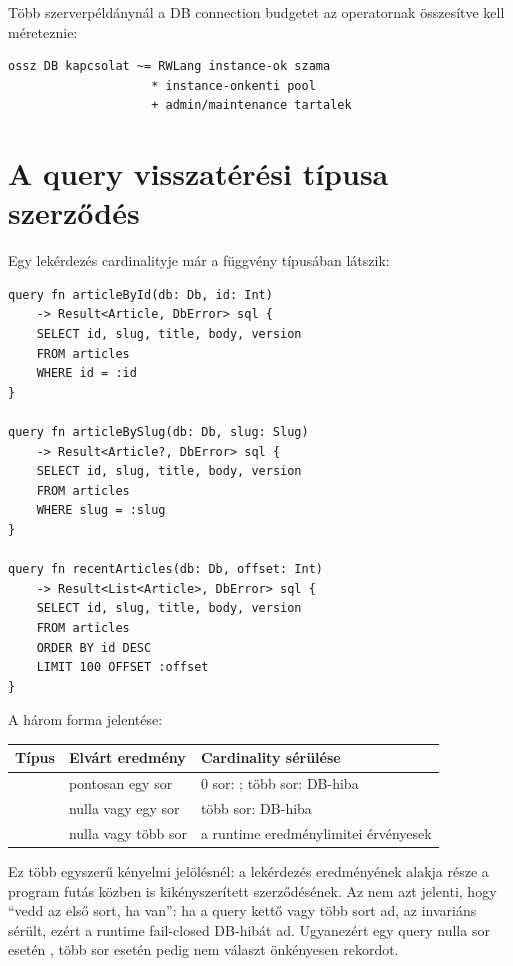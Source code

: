 Több szerverpéldánynál a DB connection budgetet az operatornak összesítve kell méreteznie:

\begin{lstlisting}
ossz DB kapcsolat ~= RWLang instance-ok szama
                    * instance-onkenti pool
                    + admin/maintenance tartalek
\end{lstlisting}

\section{A query visszatérési típusa szerződés}

Egy lekérdezés cardinalityje már a függvény típusában látszik:

\begin{lstlisting}[language=RWLang]
query fn articleById(db: Db, id: Int)
    -> Result<Article, DbError> sql {
    SELECT id, slug, title, body, version
    FROM articles
    WHERE id = :id
}

query fn articleBySlug(db: Db, slug: Slug)
    -> Result<Article?, DbError> sql {
    SELECT id, slug, title, body, version
    FROM articles
    WHERE slug = :slug
}

query fn recentArticles(db: Db, offset: Int)
    -> Result<List<Article>, DbError> sql {
    SELECT id, slug, title, body, version
    FROM articles
    ORDER BY id DESC
    LIMIT 100 OFFSET :offset
}
\end{lstlisting}

A három forma jelentése:

\begin{center}
\begin{tabularx}{\textwidth}{@{}L{0.23\textwidth}YY@{}}
\toprule
Típus & Elvárt eredmény & Cardinality sérülése \\
\midrule
{} & pontosan egy sor & 0 sor: ; több sor: DB-hiba \\
 & nulla vagy egy sor & több sor: DB-hiba \\
 & nulla vagy több sor & a runtime eredménylimitei érvényesek \\
\bottomrule
\end{tabularx}
\end{center}

Ez több egyszerű kényelmi jelölésnél: a lekérdezés eredményének alakja része a program futás közben is kikényszerített szerződésének. Az  nem azt jelenti, hogy ``vedd az első sort, ha van'': ha a query kettő vagy több sort ad, az invariáns sérült, ezért a runtime fail-closed DB-hibát ad. Ugyanezért egy  query nulla sor esetén , több sor esetén pedig nem választ önkényesen rekordot.

